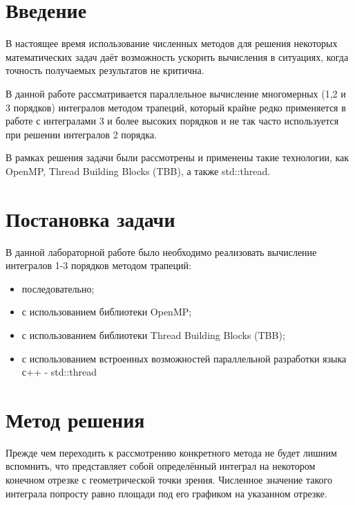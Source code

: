 \documentclass{report}
\begin{document}
	\tableofcontents
	\newpage

\section*{Введение}
\par В настоящее время использование численных методов для решения некоторых математических задач даёт возможность ускорить вычисления в ситуациях, когда точность получаемых результатов не критична.
    
\par В данной работе рассматривается параллельное вычисление многомерных (1,2 и 3 порядков) интегралов методом трапеций, который крайне редко применяется в работе с интегралами 3 и более высоких порядков и не так часто используется при решении интегралов 2 порядка.
 
\par В рамках решения задачи были рассмотрены и применены такие технологии, как OpenMP, Thread Building Blocks (TBB), а также std::thread.
\newpage
\section*{Постановка задачи}
В данной лабораторной работе было необходимо реализовать вычисление интегралов 1-3 порядков методом трапеций:
\begin{itemize}
\item последовательно;
\item с использованием библиотеки OpenMP;
\item с использованием библиотеки Thread Building Blocks (TBB);
\item с использованием встроенных возможностей параллельной разработки языка с++ - std::thread
\end{itemize}
\newpage
\section*{Метод решения}
\par Прежде чем переходить к рассмотрению конкретного метода не будет лишним вспомнить, что представляет собой определённый интеграл на некотором конечном отрезке с геометрической точки зрения. Численное значение такого интеграла попросту равно площади под его графиком на указанном отрезке. 
\end{document}
